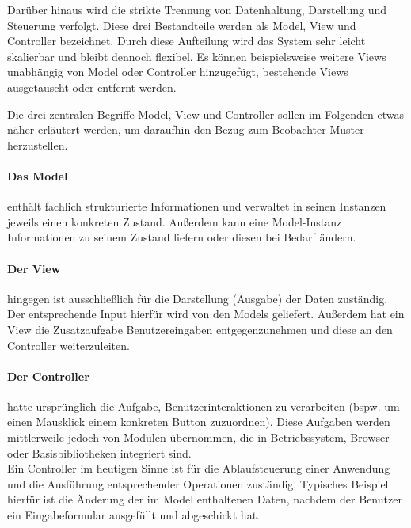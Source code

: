 Darüber hinaus wird die strikte Trennung von Datenhaltung, Darstellung und Steuerung verfolgt. Diese drei Bestandteile werden als Model, View und Controller bezeichnet. Durch diese Aufteilung wird das System sehr leicht skalierbar und bleibt dennoch flexibel. Es können beispielsweise weitere Views unabhängig von Model oder Controller hinzugefügt, bestehende Views ausgetauscht oder entfernt werden.

Die drei zentralen Begriffe Model, View und Controller sollen im Folgenden etwas näher erläutert werden, um daraufhin den Bezug zum Beobachter-Muster herzustellen.

\paragraph{Das Model} enthält fachlich strukturierte Informationen und verwaltet in seinen Instanzen jeweils einen konkreten Zustand. Außerdem kann eine Model-Instanz Informationen zu seinem Zustand liefern oder diesen bei Bedarf ändern.

\paragraph{Der View} hingegen ist ausschließlich für die Darstellung (Ausgabe) der Daten zuständig. Der entsprechende Input hierfür wird von den Models geliefert. Außerdem hat ein View die Zusatzaufgabe Benutzereingaben entgegenzunehmen und diese an den Controller weiterzuleiten. %

\paragraph{Der Controller} hatte ursprünglich die Aufgabe, Benutzerinteraktionen zu verarbeiten (bspw. um einen Mausklick einem konkreten Button zuzuordnen). Diese Aufgaben werden mittlerweile jedoch von Modulen übernommen, die in Betriebssystem, Browser oder Basisbibliotheken integriert sind.\\
Ein Controller im heutigen Sinne ist für die Ablaufsteuerung einer Anwendung und die Ausführung entsprechender Operationen zuständig. Typisches Beispiel hierfür ist die Änderung der im Model enthaltenen Daten, nachdem der Benutzer ein Eingabeformular ausgefüllt und abgeschickt hat.

